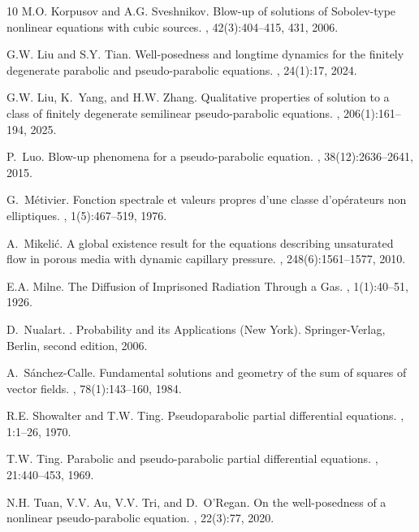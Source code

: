 \documentclass[11pt,a4paper]{article}
\numberwithin{equation}{section}
\numberwithin{remark}{section}
\begin{document}
\begin{thebibliography}{10}
M.O. Korpusov and A.G. Sveshnikov.
\newblock Blow-up of solutions of {S}obolev-type nonlinear equations with cubic
  sources.
, 42(3):404--415, 431, 2006.

G.W. Liu and S.Y. Tian.
\newblock Well-posedness and longtime dynamics for the finitely degenerate
  parabolic and pseudo-parabolic equations.
, 24(1):17, 2024.

G.W. Liu, K.~Yang, and H.W. Zhang.
\newblock Qualitative properties of solution to a class of finitely degenerate
  semilinear pseudo-parabolic equations.
, 206(1):161--194, 2025.

P.~Luo.
\newblock Blow-up phenomena for a pseudo-parabolic equation.
, 38(12):2636--2641, 2015.

G.~M\'{e}tivier.
\newblock Fonction spectrale et valeurs propres d'une classe d'op\'{e}rateurs
  non elliptiques.
, 1(5):467--519, 1976.

A.~Mikeli\'{c}.
\newblock A global existence result for the equations describing unsaturated
  flow in porous media with dynamic capillary pressure.
, 248(6):1561--1577, 2010.

E.A. Milne.
\newblock The {D}iffusion of {I}mprisoned {R}adiation {T}hrough a {G}as.
, 1(1):40--51, 1926.

D.~Nualart.
.
\newblock Probability and its Applications (New York). Springer-Verlag, Berlin,
  second edition, 2006.

A.~S\'{a}nchez-Calle.
\newblock Fundamental solutions and geometry of the sum of squares of vector
  fields.
, 78(1):143--160, 1984.

R.E. Showalter and T.W. Ting.
\newblock Pseudoparabolic partial differential equations.
, 1:1--26, 1970.

T.W. Ting.
\newblock Parabolic and pseudo-parabolic partial differential equations.
, 21:440--453, 1969.

N.H. Tuan, V.V. Au, V.V. Tri, and D.~O'Regan.
\newblock On the well-posedness of a nonlinear pseudo-parabolic equation.
, 22(3):77, 2020.


\end{thebibliography}
\end{document}
